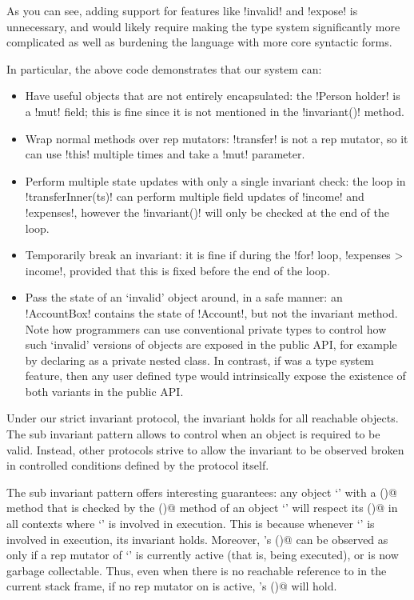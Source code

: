 As you can see, adding support for features like \Q!invalid! and \Q!expose! is unnecessary, and would likely require making the type system significantly more complicated as well as burdening the language with more core syntactic forms.

In particular, the above code demonstrates that our system can:
\begin{itemize}
\item Have useful objects that are not entirely encapsulated: the \Q!Person holder! is a \Q!mut! field; this is fine since it is not mentioned in the \Q!invariant()! method.
\item Wrap normal methods over rep mutators: \Q!transfer! is not a rep mutator, so it can use \Q!this! multiple times and take a \Q!mut! parameter.
\item Perform multiple state updates with only a single invariant check: the loop in \Q!transferInner(ts)! can perform multiple field updates of \Q!income! and \Q!expenses!, however the \Q!invariant()! will only be checked at the end of the loop.
\item Temporarily break an invariant: it is fine if during the \Q!for! loop, \Q!expenses > income!, provided that this is fixed before the end of the loop.
\item Pass the state of an `invalid' object around, in a safe manner: an \Q!AccountBox! contains the state of \Q!Account!, but not the invariant method.
Note how programmers can use conventional private types to control how such `invalid' versions of objects are exposed in the public API, for example by 
declaring \Q@AccountBox@ as a private nested class.
In contrast, if \Q@invalid@ was a type system feature, then any user defined type would intrinsically expose the existence of both variants in the public API.
\end{itemize}

Under our strict invariant protocol, the invariant holds for all reachable objects.
The sub invariant pattern allows to control when an object is required to be valid.
Instead, other protocols strive to allow the invariant to be observed broken in controlled conditions defined by the protocol itself.

The sub invariant pattern offers interesting guarantees:
any object `\Q@a@' with a \Q@subInvariant()@ method that is checked by the \Q@invariant()@ method of an object `\Q@b@'
will respect its \Q@subInvariant()@ in all contexts where `\Q@b@' is involved in execution.
This is because whenever `\Q@b@' is involved in execution, its invariant holds.
Moreover, \Q@a@'s \Q@subInvariant()@ can be observed as \Q@false@ only if a rep mutator of `\Q@b@' is currently active (that is, being executed),
or \Q@b@ is now garbage collectable.
Thus, even when there is no reachable reference to \Q@b@ in the current stack frame,
if no rep mutator on \Q@b@ is active, \Q@a@'s \Q@subInvariant()@ will hold.

